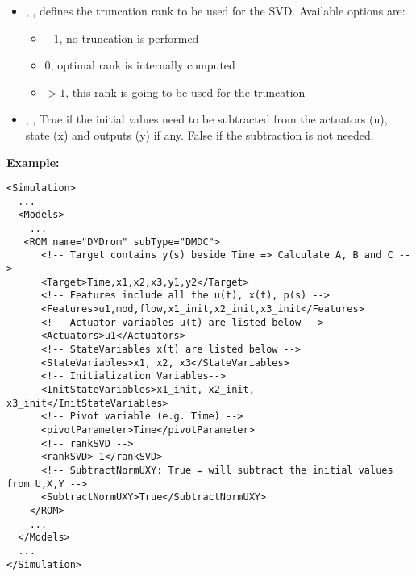 \begin{itemize}
  \item {}, , defines the truncation rank to be used for the SVD.
     Available options are:
     \begin{itemize}
     \item \textit{$-1$}, no truncation is performed
     \item \textit{$0$}, optimal rank is internally computed
     \item \textit{$>1$}, this rank is going to be used for the truncation
   \end{itemize}
  \item {}, , True if the initial values need to be subtracted from the 
  actuators (u), state (x) and outputs (y) if any. False if the subtraction is not needed.

\end{itemize}

\textbf{Example:}
\begin{lstlisting}[style=XML,morekeywords={name,subType}]
<Simulation>
  ...
  <Models>
    ...
   <ROM name="DMDrom" subType="DMDC">
      <!-- Target contains y(s) beside Time => Calculate A, B and C -->
      <Target>Time,x1,x2,x3,y1,y2</Target>
      <!-- Features include all the u(t), x(t), p(s) -->
      <Features>u1,mod,flow,x1_init,x2_init,x3_init</Features>
      <!-- Actuator variables u(t) are listed below -->
      <Actuators>u1</Actuators>
      <!-- StateVariables x(t) are listed below -->
      <StateVariables>x1, x2, x3</StateVariables>
      <!-- Initialization Variables-->
      <InitStateVariables>x1_init, x2_init, x3_init</InitStateVariables>
      <!-- Pivot variable (e.g. Time) -->
      <pivotParameter>Time</pivotParameter>
      <!-- rankSVD -->
      <rankSVD>-1</rankSVD>
      <!-- SubtractNormUXY: True = will subtract the initial values from U,X,Y -->
      <SubtractNormUXY>True</SubtractNormUXY>
    </ROM>
    ...
  </Models>
  ...
</Simulation>
\end{lstlisting}


